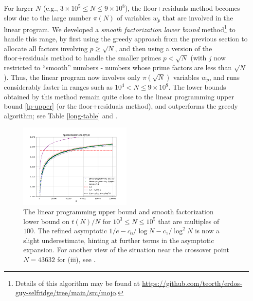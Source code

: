 \documentclass[12pt,a4paper,reqno]{amsart}
\numberwithin{equation}{section}
\theoremstyle{plain}
\theoremstyle{definition}
\begin{document}
For larger $N$ (e.g., $3 \times 10^5 \leq N \leq 9 \times 10^8$), the floor+residuals method becomes slow due to the large number $\pi(N)$ of variables $w_p$ that are involved in the linear program.  We developed a \emph{smooth factorization lower bound} method\footnote{Details of this algorithm may be found at \url{https://github.com/teorth/erdos-guy-selfridge/tree/main/src/mojo}.} to handle this range, by first using the greedy approach from the previous section to allocate all factors involving $p \geq \sqrt{N}$, and then using a version of the floor+residuals method to handle the smaller primes $p < \sqrt{N}$ (with $j$ now restricted to ``smooth'' numbers - numbers whose prime factors are less than $\sqrt{N}$).  Thus, the linear program now involves only $\pi(\sqrt{N})$ variables $w_p$, and runs considerably faster in ranges such as $10^4 < N \leq 9 \times 10^8$.  The lower bounds obtained by this method remain quite close to the linear programming upper bound \eqref{lp-upper} (or the floor+residuals method), and outperforms the greedy algorithm; see Table \ref{long-table} and .


  \begin{figure}
    \centering
    \includegraphics[width=0.5\textwidth]{longerplot.png}
    \caption{The linear programming upper bound and smooth factorization lower bound on $t(N)/N$ for $10^3 \leq N \leq 10^5$ that are multiples of $100$. The refined asymptotic $1/e - c_0/\log N - c_1/\log^2 N$ is now a slight underestimate, hinting at further terms in the asymptotic expansion. For another view of the situation near the crossover point $N=43632$ for (iii), see .}
    \label{fig-longer}
    \end{figure}
\end{document}
